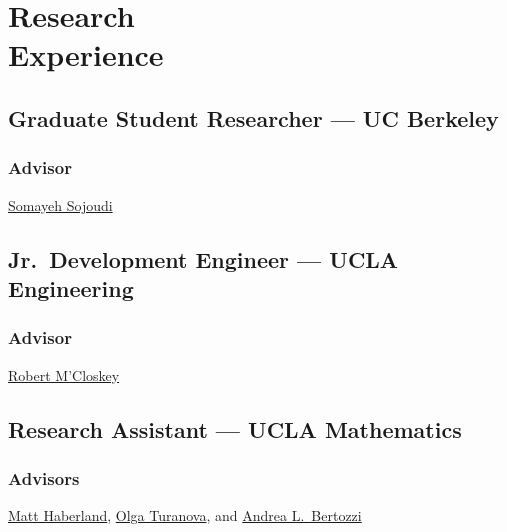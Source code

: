 \section{\texorpdfstring{Research \\[\baselineskip] Experience}{Research Experience}}
\hfill\vspace*{-2\baselineskip}

\subsection{Graduate Student Researcher --- UC Berkeley}

\subsubsection{Advisor}
\href{https://people.eecs.berkeley.edu/~sojoudi/}{Somayeh Sojoudi}

\vspace*{\subsectionskip}

\subsection{Jr.\ Development Engineer --- UCLA Engineering}

\subsubsection{Advisor}
\href{http://www.seas.ucla.edu/mcloskey/}{Robert M'Closkey}

\vspace*{\subsectionskip}

\subsection{Research Assistant --- UCLA Mathematics}

\subsubsection{Advisors}
\href{https://brae.calpoly.edu/faculty-and-staff-haberland}{Matt Haberland}, \href{https://sites.google.com/msu.edu/turanova/home}{Olga Turanova}, and \href{http://www.math.ucla.edu/~bertozzi/}{Andrea L.\ Bertozzi}
